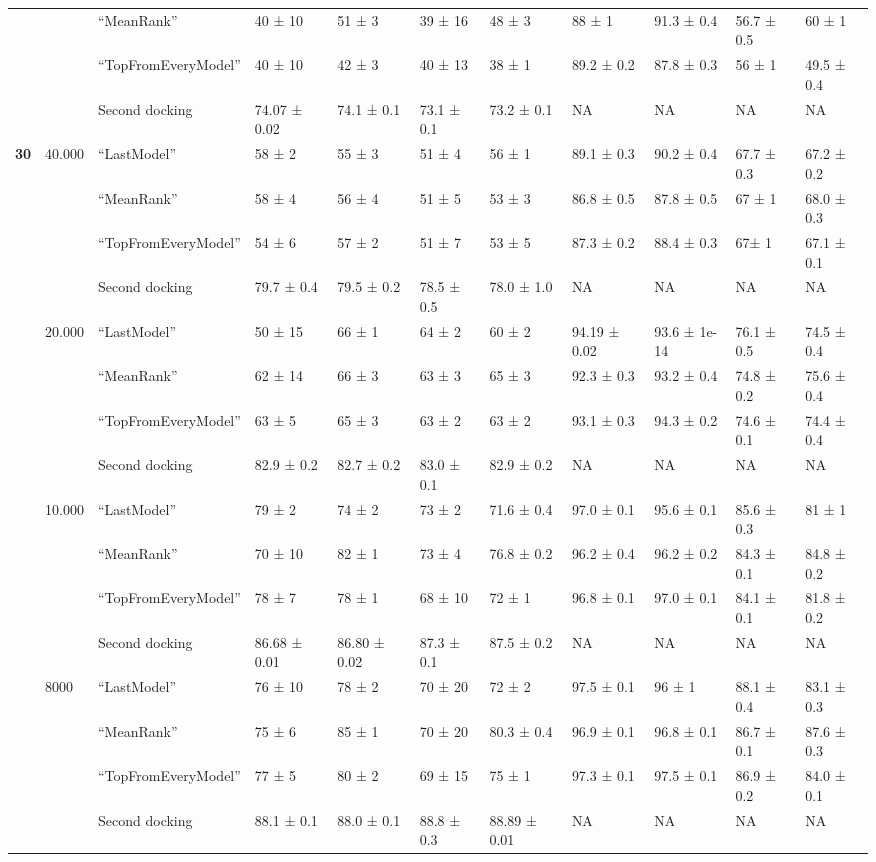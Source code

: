 \begin{tabular}{|l|llllllllll|}
    \textbf{} & ~ & “MeanRank” & 40 ± 10 & 51 ± 3 & 39 ± 16 & 48 ± 3 & 88 ± 1 & 91.3 ± 0.4 & 56.7 ± 0.5 & 60 ± 1 \\ 
    \textbf{} & ~ & “TopFromEveryModel” & 40 ± 10 & 42 ± 3 & 40 ± 13 & 38 ± 1 & 89.2 ± 0.2 & 87.8 ± 0.3 & 56 ± 1 & 49.5 ± 0.4 \\ 
    \textbf{} & ~ & Second docking & 74.07 ± 0.02 & 74.1 ± 0.1 & 73.1 ± 0.1 & 73.2 ± 0.1 & NA & NA & NA & NA \\ 
    \textbf{30} & 40.000 & “LastModel” & 58 ± 2 & 55 ± 3 & 51 ± 4 & 56 ± 1 & 89.1 ± 0.3 & 90.2 ± 0.4 & 67.7 ± 0.3 & 67.2 ± 0.2 \\ 
    \textbf{} & ~ & “MeanRank” & 58 ± 4 & 56 ± 4 & 51 ± 5 & 53 ± 3 & 86.8 ± 0.5 & 87.8 ± 0.5 & 67 ± 1 & 68.0 ± 0.3 \\ 
    \textbf{} & ~ & “TopFromEveryModel” & 54 ± 6 & 57 ± 2 & 51 ± 7 & 53 ± 5 & 87.3 ± 0.2 & 88.4 ± 0.3 & 67± 1 & 67.1 ± 0.1 \\ 
    \textbf{} & ~ & Second docking & 79.7 ± 0.4 & 79.5 ± 0.2 & 78.5 ± 0.5 & 78.0 ± 1.0 & NA & NA & NA & NA \\ 
    \textbf{} & 20.000 & “LastModel” & 50 ± 15 & 66 ± 1 & 64 ± 2 & 60 ± 2 & 94.19 ± 0.02 & 93.6 ± 1e-14 & 76.1 ± 0.5 & 74.5 ± 0.4 \\ 
    \textbf{} & ~ & “MeanRank” & 62 ± 14 & 66 ± 3 & 63 ± 3 & 65 ± 3 & 92.3 ± 0.3 & 93.2 ± 0.4 & 74.8 ± 0.2 & 75.6 ± 0.4 \\ 
    \textbf{} & ~ & “TopFromEveryModel” & 63 ± 5 & 65 ± 3 & 63 ± 2 & 63 ± 2 & 93.1 ± 0.3 & 94.3 ± 0.2 & 74.6 ± 0.1 & 74.4 ± 0.4 \\ 
    \textbf{} & ~ & Second docking & 82.9 ± 0.2 & 82.7 ± 0.2 & 83.0 ± 0.1 & 82.9 ± 0.2 & NA & NA & NA & NA \\ 
    \textbf{} & 10.000 & “LastModel” & 79 ± 2 & 74 ± 2 & 73 ± 2 & 71.6 ± 0.4 & 97.0 ± 0.1 & 95.6 ± 0.1 & 85.6 ± 0.3 & 81 ± 1 \\ 
    \textbf{} & ~ & “MeanRank” & 70 ± 10 & 82 ± 1 & 73 ± 4 & 76.8 ± 0.2 & 96.2 ± 0.4 & 96.2 ± 0.2 & 84.3 ± 0.1 & 84.8 ± 0.2 \\ 
    \textbf{} & ~ & “TopFromEveryModel” & 78 ± 7 & 78 ± 1 & 68 ± 10 & 72 ± 1 & 96.8 ± 0.1 & 97.0 ± 0.1 & 84.1 ± 0.1 & 81.8 ± 0.2 \\ 
    \textbf{} & ~ & Second docking & 86.68 ± 0.01 & 86.80 ± 0.02 & 87.3 ± 0.1 & 87.5 ± 0.2 & NA & NA & NA & NA \\ 
    \textbf{} & 8000 & “LastModel” & 76 ± 10 & 78 ± 2 & 70 ± 20 & 72 ± 2 & 97.5 ± 0.1 & 96 ± 1 & 88.1 ± 0.4 & 83.1 ± 0.3 \\ 
    \textbf{} & ~ & “MeanRank” & 75 ± 6 & 85 ± 1 & 70 ± 20 & 80.3 ± 0.4 & 96.9 ± 0.1 & 96.8 ± 0.1 & 86.7 ± 0.1 & 87.6 ± 0.3 \\ 
    \textbf{} & ~ & “TopFromEveryModel” & 77 ± 5 & 80 ± 2 & 69 ± 15 & 75 ± 1 & 97.3 ± 0.1 & 97.5 ± 0.1 & 86.9 ± 0.2 & 84.0 ± 0.1 \\ 
    \textbf{} & ~ & Second docking & 88.1 ± 0.1 & 88.0 ± 0.1 & 88.8 ± 0.3 & 88.89 ± 0.01 & NA & NA & NA & NA \\ \hline
\end{tabular}
